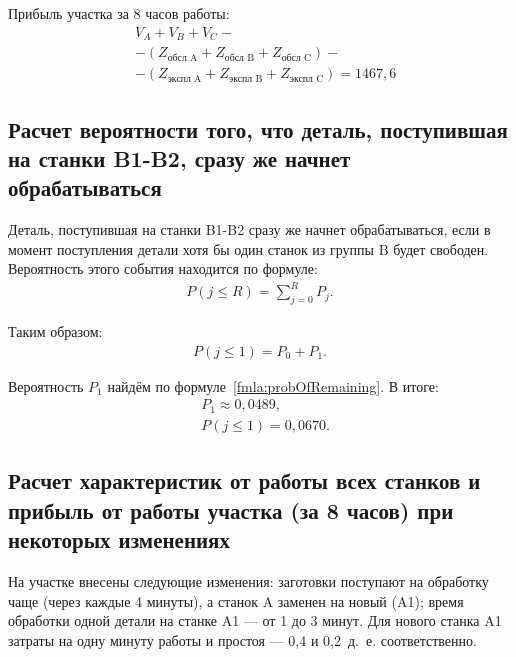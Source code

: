 Прибыль участка за 8 часов работы:
\begin{equation*}
	\begin{aligned}
		&V_A + V_B + V_C - \\ 
		&-(Z_{\text{обсл A}} + Z_{\text{обсл B}} + Z_{\text{обсл C}}) -\\ 
		&-(Z_{\text{экспл A}} + Z_{\text{экспл B}} + Z_{\text{экспл C}}) = 1467,6
	\end{aligned}
\end{equation*}

\newpage



\subsection{Расчет вероятности того, что деталь, поступившая на станки B1-B2, сразу же начнет обрабатываться}

Деталь, поступившая на станки B1-B2 сразу же начнет обрабатываться, если в момент поступления детали хотя бы один станок из группы B будет свободен. Вероятность этого события находится по формуле:
\begin{align}
	P(j \le R) = \sum_{j=0}^{R} P_j.
\end{align}

Таким образом:
\begin{align}
	P(j \le 1) = P_0 + P_1.
\end{align}

Вероятность $P_1$ найдём по формуле~\ref{fmla:probOfRemaining}. В итоге:
\begin{equation}
	\begin{aligned}
		&P_1 \approx 0,0489, \\
		&P(j \le 1) = 0,0670.
	\end{aligned}
\end{equation}

\newpage



\subsection{Расчет характеристик от работы всех станков и прибыль от работы участка (за 8 часов) при некоторых изменениях}
На участке внесены следующие изменения: заготовки поступают на обработку чаще (через каждые 4 минуты), а станок A заменен на новый (A1); время обработки одной детали на станке A1 --- от 1 до 3 минут. Для нового станка A1 затраты на одну минуту работы и простоя --- 0,4 и 0,2~д.~е. соответственно.

